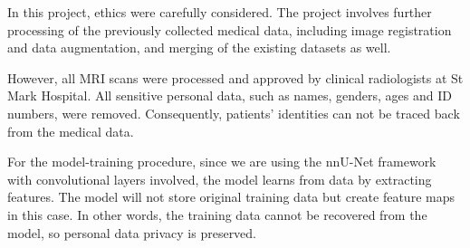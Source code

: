 In this project, ethics were carefully considered. The project involves further processing of the previously collected medical data, including image registration and data augmentation, and merging of the existing datasets as well. \medskip

\noindent However, all MRI scans were processed and approved by clinical radiologists at St Mark Hospital. All sensitive personal data, such as names, genders, ages and ID numbers, were removed. Consequently, patients' identities can not be traced back from the medical data. \medskip

\noindent For the model-training procedure, since we are using the nnU-Net framework with convolutional layers involved, the model learns from data by extracting features. The model will not store original training data but create feature maps in this case. In other words, the training data cannot be recovered from the model, so personal data privacy is preserved.